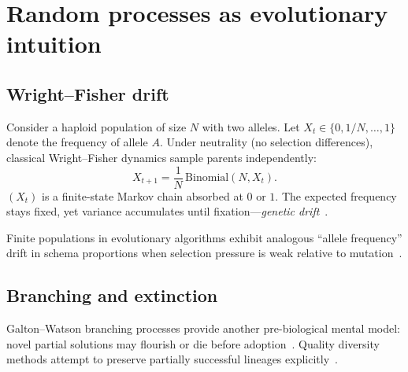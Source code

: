 \section{Random processes as evolutionary intuition}
\label{sec:stoch}

\subsection{Wright--Fisher drift}
Consider a haploid population of size $N$ with two alleles.
Let $X_t\in\{0,1/N,\dots,1\}$ denote the frequency of allele $A$.
Under neutrality (no selection differences), classical Wright--Fisher dynamics sample parents independently:
\begin{equation}
  X_{t+1} = \frac{1}{N}\,\mathrm{Binomial}(N,X_t).
\end{equation}
$(X_t)$ is a finite-state Markov chain absorbed at $0$ or $1$.
The expected frequency stays fixed, yet variance accumulates until fixation---\emph{genetic drift}~\cite{ewens2004mathematical,durrett2008probability}.

\begin{remark}
Finite populations in evolutionary algorithms exhibit analogous ``allele frequency'' drift in schema proportions when selection pressure is weak relative to mutation~\cite{goldberg1989genetic}.
\end{remark}

\subsection{Branching and extinction}
Galton--Watson branching processes provide another pre-biological mental model: novel partial solutions may flourish or die before adoption~\cite{durrett2008probability}.
Quality diversity methods attempt to preserve partially successful lineages explicitly~\cite{mouret2015illuminating}.
